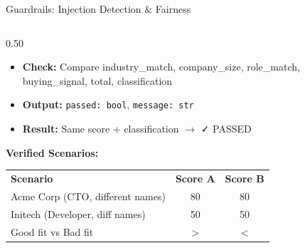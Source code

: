 \documentclass[aspectratio=169,10pt]{beamer}
\begin{document}
\begin{frame}{Guardrails: Injection Detection \& Fairness}
\begin{columns}[T]
\begin{column}{0.50\textwidth}
\begin{tcolorbox}[colback=accentgreen!3,colframe=accentgreen!50,arc=3mm,fonttitle=\scriptsize\bfseries,
    title={Fairness Check in \texttt{fairness\_check.py}}]
\begin{itemize}
      \item \textbf{Check:} Compare industry\_match, company\_size, role\_match, buying\_signal, total, classification
      \item \textbf{Output:} \texttt{passed: bool}, \texttt{message: str}
      \item \textbf{Result:} Same score + classification $\to$ \textcolor{accentgreen}{\faCheck\; PASSED}
    \end{itemize}
  \end{tcolorbox}
  \vspace{4pt}
  {\scriptsize\bfseries Verified Scenarios:}
  \vspace{2pt}
  \centering
  \begin{tabular}{@{}lcc@{}}
    \toprule
    \rowcolor{darkblue}\color{white}\textbf{Scenario} & \color{white}\textbf{Score A} & \color{white}\textbf{Score B} \\
    \rowcolor{rowA} Acme Corp (CTO, different names) & 80 & 80 \\
    \rowcolor{rowB} Initech (Developer, diff names)  & 50 & 50 \\
    \rowcolor{rowA} Good fit vs Bad fit               & $>$ & $<$ \\
    \bottomrule
  \end{tabular}
\end{column}
\end{columns}
\end{frame}
\end{document}

